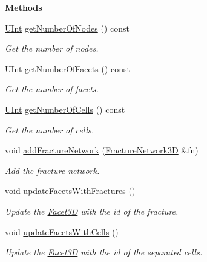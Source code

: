 \begin{Indent}{\bf Methods}\par
\begin{DoxyCompactItemize}
\item 
\hyperlink{namespaceFVCode3D_a4bf7e328c75d0fd504050d040ebe9eda}{U\+Int} \hyperlink{classFVCode3D_1_1Mesh3D_a22a32ee29c78d07cbdd033adf61bfa65}{get\+Number\+Of\+Nodes} () const 
\begin{DoxyCompactList}\small\item\em Get the number of nodes. \end{DoxyCompactList}\item 
\hyperlink{namespaceFVCode3D_a4bf7e328c75d0fd504050d040ebe9eda}{U\+Int} \hyperlink{classFVCode3D_1_1Mesh3D_a18c46222fef3bcbaacc0e32e6fb40ec0}{get\+Number\+Of\+Facets} () const 
\begin{DoxyCompactList}\small\item\em Get the number of facets. \end{DoxyCompactList}\item 
\hyperlink{namespaceFVCode3D_a4bf7e328c75d0fd504050d040ebe9eda}{U\+Int} \hyperlink{classFVCode3D_1_1Mesh3D_ab097ec995d4a70d599de3e5cd0ffe8b0}{get\+Number\+Of\+Cells} () const 
\begin{DoxyCompactList}\small\item\em Get the number of cells. \end{DoxyCompactList}\item 
void \hyperlink{classFVCode3D_1_1Mesh3D_a269c01796091da2f599e66b6b91b39dd}{add\+Fracture\+Network} (\hyperlink{classFVCode3D_1_1FractureNetwork3D}{Fracture\+Network3D} \&fn)
\begin{DoxyCompactList}\small\item\em Add the fracture network. \end{DoxyCompactList}\item 
void \hyperlink{classFVCode3D_1_1Mesh3D_a164529f402302f3f74235ad91c8bea07}{update\+Facets\+With\+Fractures} ()
\begin{DoxyCompactList}\small\item\em Update the \hyperlink{classFVCode3D_1_1Mesh3D_1_1Facet3D}{Facet3D} with the id of the fracture. \end{DoxyCompactList}\item 
void \hyperlink{classFVCode3D_1_1Mesh3D_ab1595d6ad6373719cf597c323ed6909b}{update\+Facets\+With\+Cells} ()
\begin{DoxyCompactList}\small\item\em Update the \hyperlink{classFVCode3D_1_1Mesh3D_1_1Facet3D}{Facet3D} with the id of the separated cells. \end{DoxyCompactList}\item 

\end{DoxyCompactItemize}
\end{Indent}
